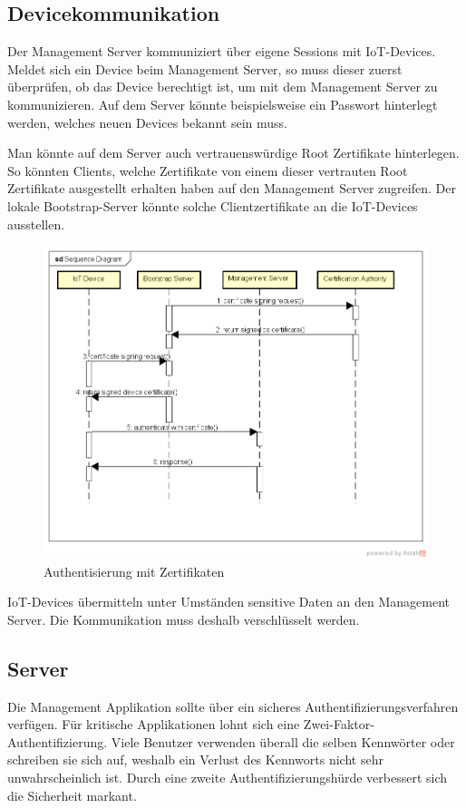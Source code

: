 \subsection{Devicekommunikation}
Der Management Server kommuniziert über eigene Sessions mit IoT-Devices. Meldet sich ein Device beim Management Server, so muss dieser zuerst überprüfen, ob das Device berechtigt ist, um mit dem Management Server zu kommunizieren. Auf dem Server könnte beispielsweise ein Passwort hinterlegt werden, welches neuen Devices bekannt sein muss. 

Man könnte auf dem Server auch vertrauenswürdige Root Zertifikate hinterlegen. So könnten Clients, welche Zertifikate von einem dieser vertrauten Root Zertifikate ausgestellt erhalten haben auf den Management Server zugreifen. Der lokale Bootstrap-Server könnte solche Clientzertifikate an die IoT-Devices ausstellen.

\begin{figure}[H]
\centering
\includegraphics[scale=0.7]{../02_Analyse/images/certificateauthentication.png}
\caption{Authentisierung mit Zertifikaten}
\end{figure}

IoT-Devices übermitteln unter Umständen sensitive Daten an den Management Server. Die Kommunikation muss deshalb verschlüsselt werden.

\subsection{Server}
Die Management Applikation sollte über ein sicheres Authentifizierungsverfahren verfügen. Für kritische Applikationen lohnt sich eine Zwei-Faktor-Authentifizierung. Viele Benutzer verwenden überall die selben Kennwörter oder schreiben sie sich auf, weshalb ein Verlust des Kennworts nicht sehr unwahrscheinlich ist. Durch eine zweite Authentifizierungshürde verbessert sich die Sicherheit markant.

